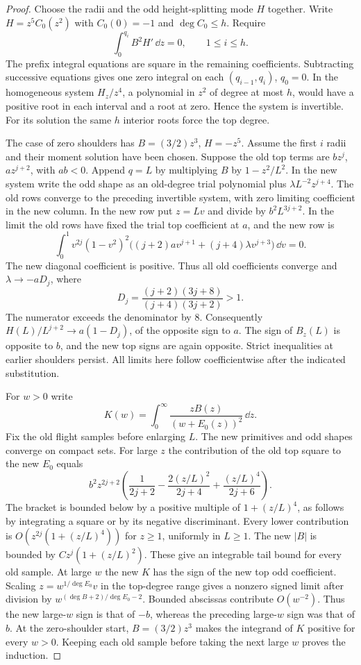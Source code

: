 \begin{proof}
Choose the radii and the odd height-splitting mode $H$ together. Write $H=z^5C_0(z^2)$ with $C_0(0)=-1$ and $\deg C_0\le h$. Require
\[
 \int_0^{q_i}B^2H'\,\dd z=0,\qquad 1\le i\le h.
\]
The prefix
integral equations are square in the remaining coefficients. Subtracting
successive equations gives one zero integral on each $(q_{i-1},q_i)$,
$q_0=0$. In the homogeneous system $H_z/z^4$, a polynomial in
$z^2$ of degree at most $h$, would have a positive root in each interval
and a root at zero. Hence the system is invertible. For its solution
the same $h$ interior roots force the top degree.

The case of zero shoulders has $B=(3/2)z^3$, $H=-z^5$.
Assume the first $i$ radii and their moment solution have been chosen. Suppose the old top terms are $b z^j$, $a z^{j+2}$, with $ab<0$.
Append $q=L$ by multiplying $B$ by $1-z^2/L^2$. In the new system
write the odd shape as an old-degree trial polynomial plus
$\lambda L^{-2}z^{j+4}$. The old rows converge to the preceding
invertible system, with zero limiting coefficient in the new column.
In the new row put $z=Lv$ and divide by $b^2 L^{3j+2}$. In the limit
the old rows have fixed the trial top coefficient at $a$, and the new
row is
\[
 \int_0^1 v^{2j}(1-v^2)^2\big((j+2)a v^{j+1}
                            +(j+4)\lambda v^{j+3}\big)\,\dd v=0.
\]
The new diagonal coefficient is positive. Thus all old coefficients
converge and $\lambda\to-aD_j$, where
\[
 D_j=\frac{(j+2)(3j+8)}{(j+4)(3j+2)}>1 .
\]
The numerator exceeds the denominator by $8$.
Consequently $H(L)/L^{j+2}\to a(1-D_j)$, of the opposite sign to $a$.
The sign of $B_z(L)$ is opposite to $b$, and the new top signs are
again opposite. Strict inequalities at earlier shoulders persist. All
limits here follow coefficientwise after the indicated substitution.

For $w>0$ write
\[
 K(w)=\int_0^\infty \frac{zB(z)}{(w+E_0(z))^2}\,\dd z .
\]
Fix the old flight samples before enlarging $L$. The new primitives and
odd shapes converge on compact sets. For large $z$ the contribution of
the old top square to the new $E_0$ equals
\[
 b^2 z^{2j+2}\left(\frac1{2j+2}-\frac{2(z/L)^2}{2j+4}
                                +\frac{(z/L)^4}{2j+6}\right).
\]
The bracket is bounded below by a positive multiple of $1+(z/L)^4$,
as follows by integrating a square or by its negative discriminant.
Every lower contribution is $O(z^{2j}(1+(z/L)^4))$ for $z\ge1$,
uniformly in $L\ge1$. The new $|B|$ is bounded by
$Cz^j(1+(z/L)^2)$. These give an integrable tail bound for every old
sample. At large $w$ the new $K$ has the sign of the new top odd
coefficient. Scaling $z=w^{1/\deg E_0}v$ in the top-degree range gives
a nonzero signed limit after division by $w^{(\deg B+2)/\deg E_0-2}$.
Bounded abscissas contribute $O(w^{-2})$. Thus the new large-$w$ sign is that of $-b$, whereas the preceding
large-$w$ sign was that of $b$. At the zero-shoulder start,
$B=(3/2)z^3$ makes the integrand of $K$ positive for every $w>0$.
Keeping each old sample before taking the next large $w$ proves the induction.


\end{proof}
